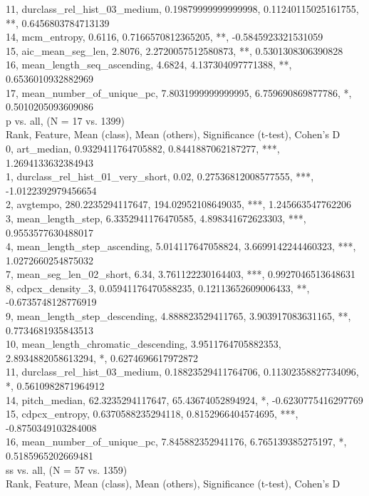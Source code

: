 11, durclass_rel_hist_03_medium, 0.19879999999999998, 0.11240115025161755, **, 0.6456803784713139\\
14, mcm_entropy, 0.6116, 0.7166570812365205, **, -0.5845923321531059\\
15, aic_mean_seg_len, 2.8076, 2.2720057512580873, **, 0.5301308306390828\\
16, mean_length_seq_ascending, 4.6824, 4.137304097771388, **, 0.6536010932882969\\
17, mean_number_of_unique_pc, 7.8031999999999995, 6.759690869877786, *, 0.5010205093609086\\
p vs. all, (N = 17 vs. 1399)\\
Rank, Feature, Mean (class), Mean (others), Significance (t-test), Cohen's D\\
0, art_median, 0.9329411764705882, 0.8441887062187277, ***, 1.2694133632384943\\
1, durclass_rel_hist_01_very_short, 0.02, 0.27536812008577555, ***, -1.0122392979456654\\
2, avgtempo, 280.2235294117647, 194.02952108649035, ***, 1.245663547762206\\
3, mean_length_step, 6.3352941176470585, 4.898341672623303, ***, 0.9553577630488017\\
4, mean_length_step_ascending, 5.014117647058824, 3.6699142244460323, ***, 1.0272660254875032\\
7, mean_seg_len_02_short, 6.34, 3.761122230164403, ***, 0.9927046513648631\\
8, cdpcx_density_3, 0.05941176470588235, 0.12113652609006433, **, -0.6735748128776919\\
9, mean_length_step_descending, 4.888823529411765, 3.903917083631165, **, 0.7734681935843513\\
10, mean_length_chromatic_descending, 3.9511764705882353, 2.8934882058613294, *, 0.6274696617972872\\
11, durclass_rel_hist_03_medium, 0.18823529411764706, 0.11302358827734096, *, 0.5610982871964912\\
14, pitch_median, 62.3235294117647, 65.43674052894924, *, -0.6230775416297769\\
15, cdpcx_entropy, 0.6370588235294118, 0.8152966404574695, ***, -0.8750349103284008\\
16, mean_number_of_unique_pc, 7.845882352941176, 6.765139385275197, *, 0.5185965202669481\\
ss vs. all, (N = 57 vs. 1359)\\
Rank, Feature, Mean (class), Mean (others), Significance (t-test), Cohen's D\\
